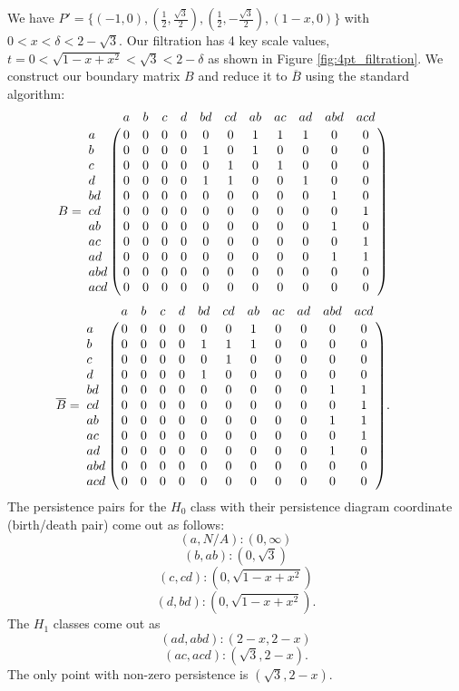 \documentclass[letterpaper,titlepage]{article}
\begin{document}
We have $P' = \{(-1,0),(\frac{1}{2},\frac{\sqrt{3}}{2}),(\frac{1}{2},-\frac{\sqrt{3}}{2}),(1-x,0)\}$ with $0< x < \delta < 2-\sqrt{3}$.
Our filtration has 4 key scale values, $t = 0<\sqrt{1-x+x^2}< \sqrt{3}< 2-\delta$ as shown in Figure \ref{fig:4pt_filtration}. We construct our boundary matrix $B$ and reduce it to $\overline{B}$ using the standard algorithm:
$$B=\bordermatrix{ 
    &   a & b & c & d & bd & cd & ab & ac & ad & abd & acd\cr
    a & 0 & 0 & 0 & 0 &  0 &  0 &  1 &  1 &  1 &   0 &   0 \cr
    b & 0 & 0 & 0 & 0 &  1 &  0 &  1 &  0 &  0 &   0 &   0\cr
    c & 0 & 0 & 0 & 0 &  0 &  1 &  0 &  1 &  0 &   0 &   0\cr
    d & 0 & 0 & 0 & 0 &  1 &  1 &  0 &  0 &  1 &   0 &   0\cr
   bd & 0 & 0 & 0 & 0 &  0 &  0 &  0 &  0 &  0 &   1 &   0\cr
   cd & 0 & 0 & 0 & 0 &  0 &  0 &  0 &  0 &  0 &   0 &   1\cr
   ab & 0 & 0 & 0 & 0 &  0 &  0 &  0 &  0 &  0 &   1 &   0\cr
   ac & 0 & 0 & 0 & 0 &  0 &  0 &  0 &  0 &  0 &   0 &   1\cr
   ad & 0 & 0 & 0 & 0 &  0 &  0 &  0 &  0 &  0 &   1 &   1\cr
  abd & 0 & 0 & 0 & 0 &  0 &  0 &  0 &  0 &  0 &   0 &   0\cr
  acd & 0 & 0 & 0 & 0 &  0 &  0 &  0 &  0 &  0 &   0 &   0\cr
    } \qquad$$
$$\overline{B}=\bordermatrix{ 
    &   a & b & c & d & bd & cd & ab & ac & ad & abd & acd\cr
    a & 0 & 0 & 0 & 0 &  0 &  0 &  1 &  0 &  0 &   0 &   0 \cr
    b & 0 & 0 & 0 & 0 &  1 &  1 &  1 &  0 &  0 &   0 &   0\cr
    c & 0 & 0 & 0 & 0 &  0 &  1 &  0 &  0 &  0 &   0 &   0\cr
    d & 0 & 0 & 0 & 0 &  1 &  0 &  0 &  0 &  0 &   0 &   0\cr
   bd & 0 & 0 & 0 & 0 &  0 &  0 &  0 &  0 &  0 &   1 &   1\cr
   cd & 0 & 0 & 0 & 0 &  0 &  0 &  0 &  0 &  0 &   0 &   1\cr
   ab & 0 & 0 & 0 & 0 &  0 &  0 &  0 &  0 &  0 &   1 &   1\cr
   ac & 0 & 0 & 0 & 0 &  0 &  0 &  0 &  0 &  0 &   0 &   1\cr
   ad & 0 & 0 & 0 & 0 &  0 &  0 &  0 &  0 &  0 &   1 &   0\cr
  abd & 0 & 0 & 0 & 0 &  0 &  0 &  0 &  0 &  0 &   0 &   0\cr
  acd & 0 & 0 & 0 & 0 &  0 &  0 &  0 &  0 &  0 &   0 &   0\cr
    }. \qquad$$
The persistence pairs for the $H_0$ class with their persistence diagram coordinate (birth/death pair) come out as follows:
$$(a,N/A): (0,\infty)$$
$$(b,ab): (0,\sqrt{3})$$
$$(c, cd): (0,\sqrt{1-x+x^2})$$
$$(d, bd): (0,\sqrt{1-x+x^2}).$$
The $H_1$ classes come out as
$$(ad, abd): (2-x, 2-x)$$
$$(ac, acd): (\sqrt{3}, 2-x).$$
The only point with non-zero persistence is $(\sqrt{3}, 2-x).$
\end{document}
